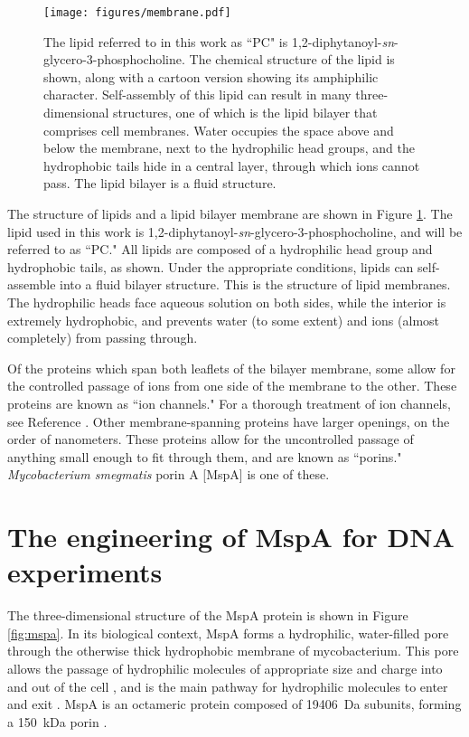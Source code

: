\begin{figure}[h]
\begin{centering}
\texttt{[image: figures/membrane.pdf]}
\caption[Lipids and the lipid bilayer membrane]{The lipid referred to in this work as ``PC" is 1,2-diphytanoyl-\textit{sn}-glycero-3-phosphocholine.  The chemical structure of the lipid is shown, along with a cartoon version showing its amphiphilic character.  Self-assembly of this lipid can result in many three-dimensional structures, one of which is the lipid bilayer that comprises cell membranes.  Water occupies the space above and below the membrane, next to the hydrophilic head groups, and the hydrophobic tails hide in a central layer, through which ions cannot pass.  The lipid bilayer is a fluid structure.}
\label{fig:lipids}
\end{centering}
\end{figure}

The structure of lipids and a lipid bilayer membrane are shown in Figure \ref{fig:lipids}.  The lipid used in this work is 1,2-diphytanoyl-\textit{sn}-glycero-3-phosphocholine, and will be referred to as ``PC."  All lipids are composed of a hydrophilic head group and hydrophobic tails, as shown.  Under the appropriate conditions, lipids can self-assemble into a fluid bilayer structure.  This is the structure of lipid membranes.  The hydrophilic heads face aqueous solution on both sides, while the interior is extremely hydrophobic, and prevents water (to some extent) and ions (almost completely) from passing through.

Of the proteins which span both leaflets of the bilayer membrane, some allow for the controlled passage of ions from one side of the membrane to the other.  These proteins are known as ``ion channels."  For a thorough treatment of ion channels, see Reference .  Other membrane-spanning proteins have larger openings, on the order of nanometers.  These proteins allow for the uncontrolled passage of anything small enough to fit through them, and are known as ``porins."  \textit{Mycobacterium smegmatis} porin A [MspA] is one of these.

\section{The engineering of MspA for DNA experiments}

The three-dimensional structure of the MspA protein is shown in Figure \ref{fig:mspa}.  In its biological context, MspA forms a hydrophilic, water-filled pore through the otherwise thick hydrophobic membrane of mycobacterium.  This pore allows the passage of hydrophilic molecules of appropriate size and charge into and out of the cell \citep{Niederweis1999}, and is the main pathway for hydrophilic molecules to enter and exit \citep{Stahl2001}.  MspA is an octameric protein composed of \SI{19406}{\dalton} subunits, forming a \SI{150}{\kilo\dalton} porin \citep{Niederweis1999}.

